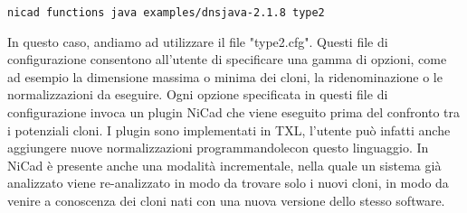 \begin{center}
\verb|nicad functions java examples/dnsjava-2.1.8 type2|
\end{center}

In questo caso, andiamo ad utilizzare il file "type2.cfg".
Questi file di configurazione consentono all'utente di specificare una gamma di opzioni, come ad esempio la dimensione massima o minima dei cloni, la ridenominazione o le normalizzazioni da eseguire. Ogni opzione specificata in questi file di configurazione invoca un plugin NiCad che viene eseguito prima del confronto tra i potenziali cloni. I plugin sono implementati in TXL, l'utente può infatti anche aggiungere nuove normalizzazioni programmandolecon questo linguaggio.
In NiCad è presente anche una modalità incrementale, nella quale un sistema già analizzato viene re-analizzato in modo da trovare solo i nuovi cloni, in modo da venire a conoscenza dei cloni nati con una nuova versione dello stesso software.





